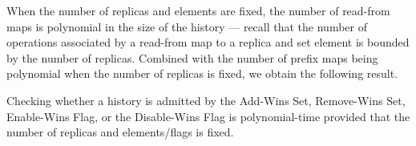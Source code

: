 When the number of replicas and elements are fixed, the number of read-from maps is polynomial in the size of the history — recall that the number of operations associated by a read-from map to a replica and set element is bounded by the number of replicas. Combined with the number of prefix maps being polynomial when the number of replicas is fixed, we obtain the following result.

\vspace{-.5mm}
\begin{theorem}
  \label{thm:ptime:sets}

  Checking whether a history is admitted by the Add-Wins Set, Remove-Wins Set, Enable-Wins Flag, or the Disable-Wins Flag is polynomial-time provided that the number of replicas and elements/flags is fixed.

\vspace{-1.5mm}
\end{theorem}

